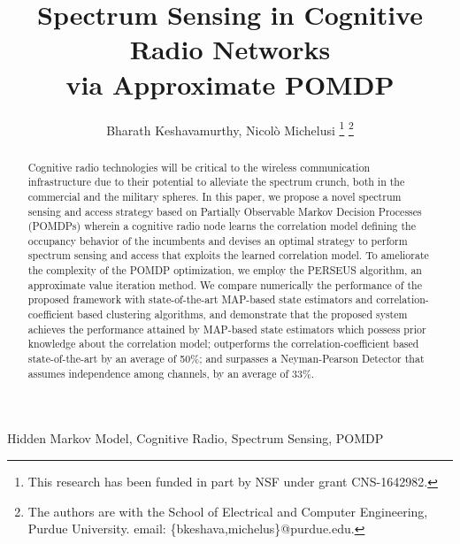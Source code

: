 \documentclass[10pt,twocolumn]{IEEEtran}
\title{Spectrum Sensing in Cognitive Radio Networks
\\
via Approximate POMDP}
\author{Bharath Keshavamurthy, Nicol\`{o} Michelusi
\thanks{This research has been funded in part by NSF under grant CNS-1642982.}
\thanks{The authors are with the School of Electrical and Computer Engineering, Purdue University. email: \{bkeshava,michelus\}@purdue.edu.}
\vspace{-5mm}}
\begin{document}
 
\maketitle
{}
\begin{abstract}
Cognitive radio technologies will be critical to the wireless communication infrastructure due to their potential to alleviate the spectrum crunch, both in the commercial and the military spheres. In this paper, we propose a novel spectrum sensing and access strategy based on Partially Observable Markov Decision Processes (POMDPs) wherein a cognitive radio node learns the correlation model defining the occupancy behavior of the incumbents and devises an optimal strategy to perform spectrum sensing and access that exploits the learned correlation model.
To ameliorate the complexity of the POMDP optimization, we employ the PERSEUS algorithm, an approximate value iteration method. We compare numerically the performance of the proposed framework with state-of-the-art MAP-based state estimators and correlation-coefficient based clustering algorithms, and demonstrate that the proposed system achieves the performance attained by MAP-based state estimators which possess prior knowledge about the correlation model; outperforms the correlation-coefficient based state-of-the-art by an average of 50\%; and surpasses a Neyman-Pearson Detector that assumes independence among channels, by an average of 33\%.
\end{abstract}
\begin{IEEEkeywords}
Hidden Markov Model, Cognitive Radio, Spectrum Sensing, POMDP
\end{IEEEkeywords}
\end{document}
